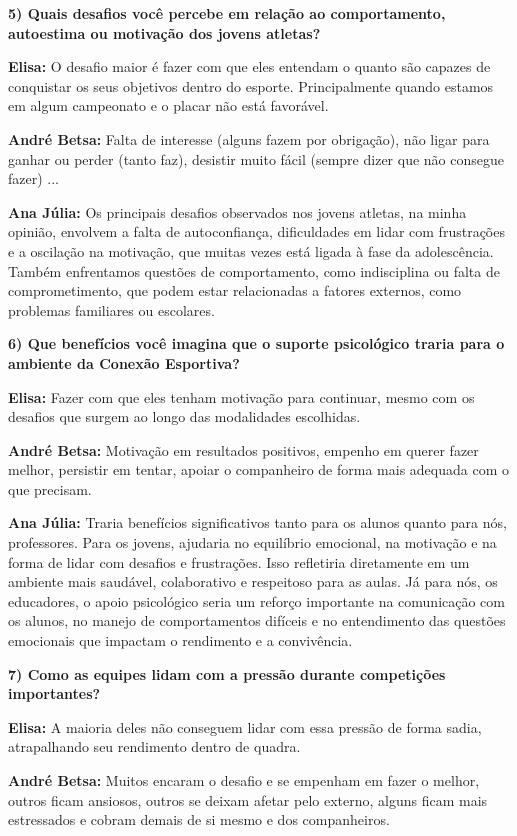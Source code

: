 \textbf{5) Quais desafios você percebe em relação ao comportamento, autoestima ou motivação dos jovens atletas?}

\textbf{Elisa:} O desafio maior é fazer com que eles entendam o quanto são capazes de conquistar os seus objetivos dentro do esporte. Principalmente quando estamos em algum campeonato e o placar não está favorável.

\textbf{André Betsa:} Falta de interesse (alguns fazem por obrigação), não ligar para ganhar ou perder (tanto faz), desistir muito fácil (sempre dizer que não consegue fazer) ...

\textbf{Ana Júlia:} Os principais desafios observados nos jovens atletas, na minha opinião, envolvem a falta de autoconfiança, dificuldades em lidar com frustrações e a oscilação na motivação, que muitas vezes está ligada à fase da adolescência. Também enfrentamos questões de comportamento, como indisciplina ou falta de comprometimento, que podem estar relacionadas a fatores externos, como problemas familiares ou escolares.

\textbf{6) Que benefícios você imagina que o suporte psicológico traria para o ambiente da Conexão Esportiva?}

\textbf{Elisa:} Fazer com que eles tenham motivação para continuar, mesmo com os desafios que surgem ao longo das modalidades escolhidas.

\textbf{André Betsa:} Motivação em resultados positivos, empenho em querer fazer melhor, persistir em tentar, apoiar o companheiro de forma mais adequada com o que precisam.

\textbf{Ana Júlia:} Traria benefícios significativos tanto para os alunos quanto para nós, professores. Para os jovens, ajudaria no equilíbrio emocional, na motivação e na forma de lidar com desafios e frustrações. Isso refletiria diretamente em um ambiente mais saudável, colaborativo e respeitoso para as aulas. Já para nós, os educadores, o apoio psicológico seria um reforço importante na comunicação com os alunos, no manejo de comportamentos difíceis e no entendimento das questões emocionais que impactam o rendimento e a convivência.

\textbf{7) Como as equipes lidam com a pressão durante competições importantes?}

\textbf{Elisa:} A maioria deles não conseguem lidar com essa pressão de forma sadia, atrapalhando seu rendimento dentro de quadra.

\textbf{André Betsa:} Muitos encaram o desafio e se empenham em fazer o melhor, outros ficam ansiosos, outros se deixam afetar pelo externo, alguns ficam mais estressados e cobram demais de si mesmo e dos companheiros.

